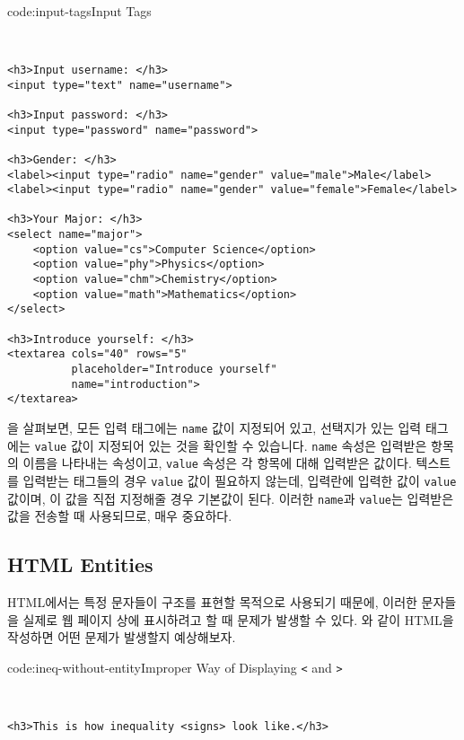 \begin{codeenv}{code:input-tags}{Input Tags}\begin{verbatim}


<h3>Input username: </h3>
<input type="text" name="username">

<h3>Input password: </h3>
<input type="password" name="password">

<h3>Gender: </h3>
<label><input type="radio" name="gender" value="male">Male</label>
<label><input type="radio" name="gender" value="female">Female</label>

<h3>Your Major: </h3>
<select name="major">
    <option value="cs">Computer Science</option>
    <option value="phy">Physics</option>
    <option value="chm">Chemistry</option>
    <option value="math">Mathematics</option>
</select>

<h3>Introduce yourself: </h3>
<textarea cols="40" rows="5"
          placeholder="Introduce yourself"
          name="introduction">
</textarea>
\end{verbatim}
\end{codeenv}

을 살펴보면, 모든 입력 태그에는 \verb|name| 값이 지정되어 있고, 선택지가 있는 입력 태그에는 \verb|value| 값이 지정되어 있는 것을 확인할 수 있습니다. \verb|name| 속성은 입력받은 항목의 이름을 나타내는 속성이고, \verb|value| 속성은 각 항목에 대해 입력받은 값이다. 텍스트를 입력받는 태그들의 경우 \verb|value| 값이 필요하지 않는데, 입력란에 입력한 값이 \verb|value| 값이며, 이 값을 직접 지정해줄 경우 기본값이 된다. 이러한 \verb|name|과 \verb|value|는 입력받은 값을 전송할 때 사용되므로, 매우 중요하다.

\subsection*{HTML Entities}

HTML에서는 특정 문자들이 구조를 표현할 목적으로 사용되기 때문에, 이러한 문자들을 실제로 웹 페이지 상에 표시하려고 할 때 문제가 발생할 수 있다. 와 같이 HTML을 작성하면 어떤 문제가 발생할지 예상해보자. 

\begin{codeenv}{code:ineq-without-entity}{Improper Way of Displaying \texttt{<} and \texttt{>}}\begin{verbatim}


<h3>This is how inequality <signs> look like.</h3>
\end{verbatim}
\end{codeenv}


